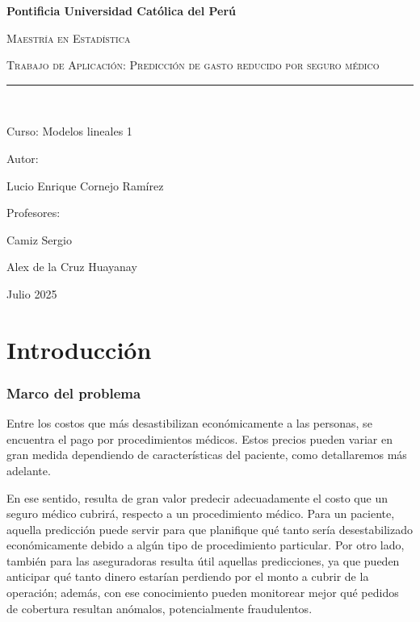 \documentclass[
]{article}
\author{}
\date{}
\renewcommand*\contentsname{Table of contents}
\newcommand\contentsname{Table of contents}
\begin{document}
\begin{titlepage}
\centering
{\bfseries\large Pontificia Universidad Católica del Perú \par}
\vspace{1cm}
{\scshape\large Maestría en Estadística \par}
\vspace{1cm}
{\scshape\large Trabajo de Aplicación: Predicción de gasto reducido por seguro médico \par}

\rule{150mm}{0.1mm}\\  
\vspace{3cm}
{\large Curso: Modelos lineales 1 \par}
\vfill
{\large Autor: \par}
{\large Lucio Enrique Cornejo Ramírez \par}
\vfill
{\large Profesores: \par}
{\large Camiz Sergio \par}
{\large Alex de la Cruz Huayanay \par}
\vfill
{\large Julio 2025 \par}
\end{titlepage}

\renewcommand{\contentsname}{Tabla de Contenidos}

\tableofcontents
\newpage

\section{Introducción}

\subsubsection{Marco del problema}\label{marco-del-problema}

Entre los costos que más desastibilizan económicamente a las personas,
se encuentra el pago por procedimientos médicos. Estos precios pueden
variar en gran medida dependiendo de características del paciente, como
detallaremos más adelante.

En ese sentido, resulta de gran valor predecir adecuadamente el costo
que un seguro médico cubrirá, respecto a un procedimiento médico. Para
un paciente, aquella predicción puede servir para que planifique qué
tanto sería desestabilizado económicamente debido a algún tipo de
procedimiento particular. Por otro lado, también para las aseguradoras
resulta útil aquellas predicciones, ya que pueden anticipar qué tanto
dinero estarían perdiendo por el monto a cubrir de la operación; además,
con ese conocimiento pueden monitorear mejor qué pedidos de cobertura
resultan anómalos, potencialmente fraudulentos.
\end{document}
